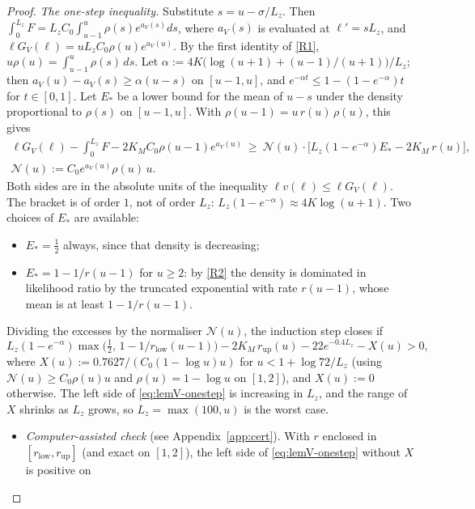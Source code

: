 \begin{proof}
\emph{The one-step inequality.} Substitute $s=u-\sigma/L_z$. Then $\int_0^{L_z}F=L_zC_0\int_{u-1}^u\rho(s)e^{a_V(s)}ds$,
where $a_V(s)$ is evaluated at $\ell'=sL_z$, and $\ell G_V(\ell)=uL_zC_0\rho(u)e^{a_V(u)}$. By the first identity of \ref{R1},
$u\rho(u)=\int_{u-1}^u\rho(s)\,ds$. Let $\alpha:=4K\big(\log(u+1)+(u-1)/(u+1)\big)/L_z$; then $a_V(u)-a_V(s)\ge\alpha(u-s)$ on
$[u-1,u]$, and $e^{-\alpha t}\le1-(1-e^{-\alpha})t$ for $t\in[0,1]$. Let $E_*$ be a lower bound for the mean of $u-s$ under the
density proportional to $\rho(s)$ on $[u-1,u]$. With $\rho(u-1)=u\,r(u)\,\rho(u)$, this gives
\begin{gather*}
  \ell G_V(\ell)-\int_0^{L_z}F-2K_MC_0\rho(u-1)e^{a_V(u)}\ \ge\ \mathcal N(u)\cdot
  \Big[L_z(1-e^{-\alpha})E_*-2K_M\,r(u)\Big],\\
  \mathcal N(u):=C_0e^{a_V(u)}\rho(u)\,u .
\end{gather*}
Both sides are in the absolute units of the inequality $\ell v(\ell)\le\ell G_V(\ell)$. The bracket is of order $1$, not of
order $L_z$: $L_z(1-e^{-\alpha})\approx4K\log(u+1)$. Two choices of $E_*$ are available:
\begin{itemize}
\item $E_*=\frac12$ always, since that density is decreasing;
\item $E_*=1-1/r(u-1)$ for $u\ge2$: by \ref{R2} the density is dominated in likelihood ratio by the truncated exponential
  with rate $r(u-1)$, whose mean is at least $1-1/r(u-1)$.
\end{itemize}
Dividing the excesses by the normaliser $\mathcal N(u)$, the induction step closes if
\begin{equation}\label{eq:lemV-onestep}
  L_z(1-e^{-\alpha})\max\big(\tfrac12,\,1-1/r_{\mathrm{low}}(u-1)\big)-2K_M\,r_{\mathrm{up}}(u)-22e^{-0.4L_z}-X(u)>0,
\end{equation}
where $X(u):=0.7627/(C_0(1-\log u)u)$ for $u<1+\log72/L_z$ (using $\mathcal N(u)\ge C_0\rho(u)u$ and $\rho(u)=1-\log u$ on
$[1,2]$), and $X(u):=0$ otherwise. The left side of \eqref{eq:lemV-onestep} is increasing in $L_z$, and the range of $X$
shrinks as $L_z$ grows, so $L_z=\max(100,u)$ is the worst case.
\begin{itemize}
\item \emph{Computer-assisted check} (see Appendix~\ref{app:cert}). With $r$ enclosed in $[r_{\mathrm{low}},r_{\mathrm{up}}]$ (and
  exact on $[1,2]$), the left side of \eqref{eq:lemV-onestep} without $X$ is positive on

\end{itemize}
\end{proof}
